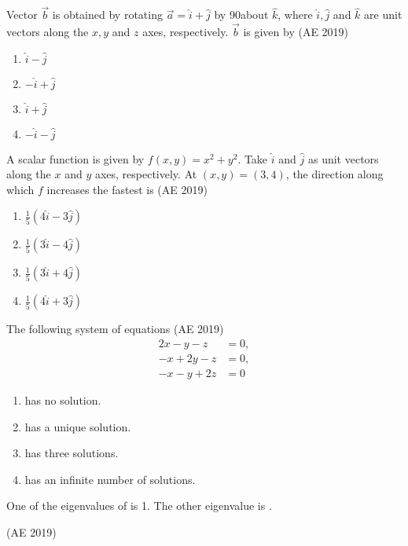 \item Vector \( \vec{b} \) is obtained by rotating \( \vec{a} = \hat{i} + \hat{j} \) by 90\degree about \( \hat{k} \), where \( \hat{i}, \hat{j} \) and \( \hat{k} \) are unit vectors along the \( x, y \) and \( z \) axes, respectively. \( \vec{b} \) is given by
	\hfill(AE 2019)
\begin{multicols}{4}
\begin{enumerate}
\item \( \hat{i} - \hat{j} \)
\item \( -\hat{i} + \hat{j} \)
\item \( \hat{i} + \hat{j} \)
\item \( -\hat{i} - \hat{j} \)
\end{enumerate}
\end{multicols}
\item A scalar function is given by \( f(x, y) = x^2 + y^2 \). Take \( \hat{i} \) and \( \hat{j} \) as unit vectors along the \( x \) and \( y \) axes, respectively. At \( (x, y) = (3, 4) \), the direction along which \( f \) increases the fastest is
	\hfill(AE 2019)
\begin{multicols}{4}
\begin{enumerate}
\item \( \frac{1}{5}(4\hat{i} - 3\hat{j}) \)
\item \( \frac{1}{5}(3\hat{i} - 4\hat{j}) \)
\item \( \frac{1}{5}(3\hat{i} + 4\hat{j}) \)
\item \( \frac{1}{5}(4\hat{i} + 3\hat{j}) \)
\end{enumerate}
\end{multicols}
\item The following system of equations
	\hfill(AE 2019)
\begin{align*}
    2x - y - z &= 0,\\
-x + 2y - z &= 0,\\
-x - y + 2z &= 0
\end{align*}
\begin{enumerate}
\item has no solution.
\item has a unique solution.
\item has three solutions.
\item has an infinite number of solutions.
\end{enumerate}
\item One of the eigenvalues of 
is 1.
The other eigenvalue is \underline{\hspace{1.5cm}}.

	\hfill(AE 2019)

